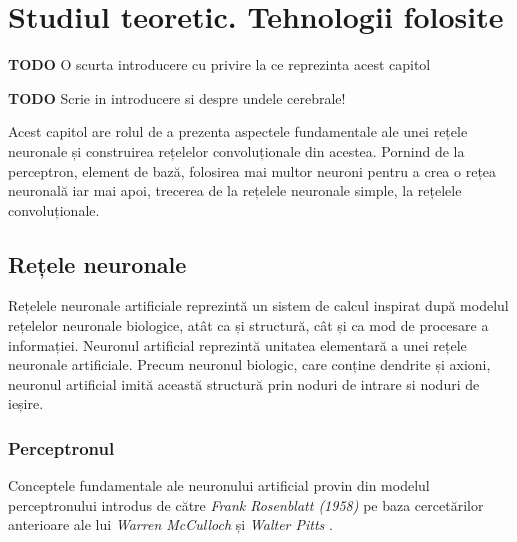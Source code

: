 \chapter{Studiul teoretic. Tehnologii folosite}\label{ch:2studiu_teoretic}
\textbf{TODO} O scurta introducere cu privire la ce reprezinta acest capitol

\textbf{TODO} Scrie in introducere si despre undele cerebrale!

Acest capitol are rolul de a prezenta aspectele fundamentale ale unei rețele neuronale și construirea rețelelor convoluționale din acestea. Pornind de la perceptron, element de bază, folosirea mai multor neuroni pentru a crea o rețea neuronală iar mai apoi, trecerea de la rețelele neuronale simple, la rețelele convoluționale.

\section{Rețele neuronale}
Rețelele neuronale artificiale reprezintă un sistem de calcul inspirat după modelul rețelelor neuronale biologice, atât ca și structură, cât și ca mod de procesare a informației. Neuronul artificial reprezintă unitatea elementară a unei rețele neuronale artificiale. Precum neuronul biologic, care conține dendrite și axioni, neuronul artificial imită această structură prin noduri de intrare si noduri de ieșire.
\subsection{Perceptronul}
Conceptele fundamentale ale neuronului artificial provin din modelul perceptronului introdus de către \textit{Frank Rosenblatt (1958)} \cite{rosenblatt1962principles} pe baza cercetărilor anterioare ale lui \textit{Warren McCulloch} și \textit{Walter Pitts} \cite{McCulloch:427611}.

